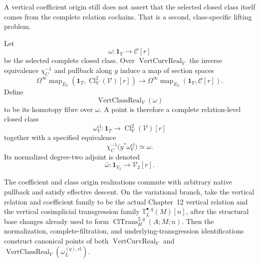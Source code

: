 A vertical coefficient origin still does not assert that the selected closed
class itself comes from the complete relation cochains.  That is a second,
class-specific lifting problem.

\begin{definition}
\label{def:prequantum-vertical-class-origin-realization}
Let
\[
\omega:\mathbf1_Y\longrightarrow\mathscr C[r]
\]
be the selected complete closed class.  Over
$\operatorname{VertCurvReal}_V$ the inverse equivalence $\chi_C^{-1}$ and
pullback along $y$ induce a map of section spaces
\[
\Omega^\infty\operatorname{map}_{E_T}
 (\mathbf1_T,\operatorname{Cl}_V^2(\mathcal V)[r])
\longrightarrow
\Omega^\infty\operatorname{map}_{E_Y}(\mathbf1_Y,\mathscr C[r]).
\]
Define
\[
\boxed{
\operatorname{VertClassReal}_V(\omega)
}
\]
to be its homotopy fibre over $\omega$.  A point is therefore a complete
relation-level closed class
\[
\omega_V^{\mathrm{cl}}:
\mathbf1_T\longrightarrow\operatorname{Cl}_V^2(\mathcal V)[r]
\]
together with a specified equivalence
\[
\chi_C^{-1}\bigl(y^*\omega_V^{\mathrm{cl}}\bigr)\simeq\omega.
\]
Its normalized degree-two adjoint is denoted
\[
\bar\omega:
\mathbf1_{V_2}\longrightarrow\mathcal V_2[r].
\]
\end{definition}

\begin{proposition}
\label{prop:prequantum-vertical-origin-descent-canonical-point}
The coefficient and class origin realizations commute with arbitrary native
pullback and satisfy effective descent.  On the variational branch, take the
vertical relation and coefficient family to be the actual Chapter~12 vertical
relation and the vertical cosimplicial transgression family
$\mathbb T_L^{\bullet,q}(M)[n]$, after the structural base changes already used
to form $\operatorname{ClTrans}^{2,q}_H(A;M;n)$.  Then the normalization,
complete-filtration, and underlying-transgression identifications construct
canonical points of both $\operatorname{VertCurvReal}_V$ and
$\operatorname{VertClassReal}_V(\omega_L^{(q),\mathrm{cl}})$.
\end{proposition}

